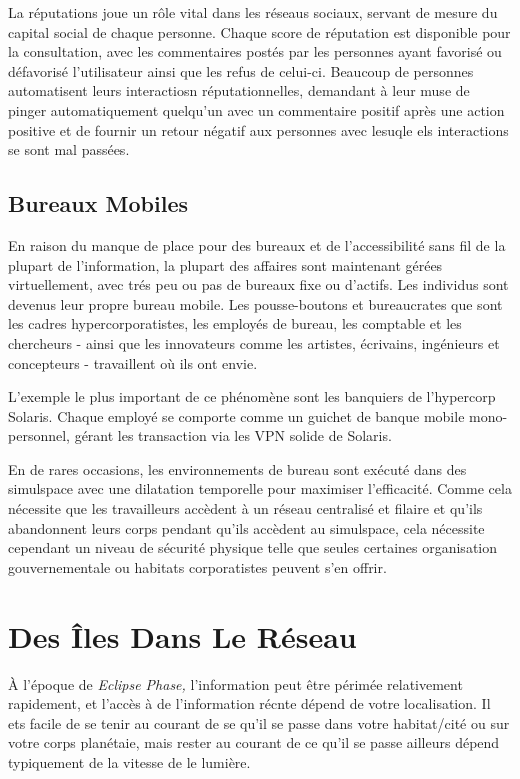 La réputations joue un rôle vital dans les réseaus sociaux, servant de mesure du capital social de chaque personne. Chaque score de réputation est disponible pour la consultation, avec les commentaires postés par les personnes ayant favorisé ou défavorisé l'utilisateur ainsi que les refus de celui-ci. Beaucoup de personnes automatisent leurs interactiosn réputationnelles, demandant à leur muse de pinger automatiquement quelqu'un avec un commentaire positif après une action positive et de fournir un retour négatif aux personnes avec lesuqle els interactions se sont mal passées. 

\subsection{Bureaux Mobiles} 

En raison du manque de place pour des bureaux et de l'accessibilité sans fil de la plupart de l'information, la plupart des affaires sont maintenant gérées virtuellement, avec trés peu ou pas de bureaux fixe ou d'actifs. Les individus sont devenus leur propre bureau mobile. Les pousse-boutons et bureaucrates que sont les cadres hypercorporatistes, les employés de bureau, les comptable et les chercheurs - ainsi que les innovateurs comme les artistes, écrivains, ingénieurs et concepteurs - travaillent où ils ont envie. 

L'exemple le plus important de ce phénomène sont les banquiers de l'hypercorp Solaris. Chaque employé se comporte comme un guichet de banque mobile mono-personnel, gérant les transaction via les VPN solide de Solaris. 

En de rares occasions, les environnements de bureau sont exécuté dans des simulspace avec une dilatation temporelle pour maximiser l'efficacité. Comme cela nécessite que les travailleurs accèdent à un réseau centralisé et filaire et qu'ils abandonnent leurs corps pendant qu'ils accèdent au simulspace, cela nécessite cependant un niveau de sécurité physique telle que seules certaines organisation gouvernementale ou habitats corporatistes peuvent s'en offrir. 

\section{Des Îles Dans Le Réseau} 

À l'époque de \textit{Eclipse Phase,} l'information peut être périmée relativement rapidement, et l'accès à de l'information récnte dépend de votre localisation. Il ets facile de se tenir au courant de se qu'il se passe dans votre habitat/cité ou sur votre corps planétaie, mais rester au courant de ce qu'il se passe ailleurs dépend typiquement de la vitesse de le lumière. 

